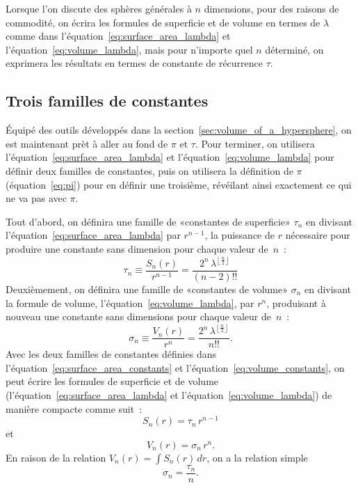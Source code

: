 Lorsque l'on discute des sphères générales à $n$ dimensions, pour des raisons de
commodité, on écrira les formules de superficie et de volume en termes de
$\lambda$ comme dans l'équation~\eqref{eq:surface_area_lambda} et
l'équation~\eqref{eq:volume_lambda}, mais pour n'importe quel $n$ déterminé, on
exprimera les résultats en termes de constante de récurrence $\tau$.




  \subsection{Trois familles de constantes} %
  \label{sec:three_families_of_constants}

Équipé des outils développés dans la section~\ref{sec:volume_of_a_hypersphere},
on est maintenant prèt à aller au fond de $\pi$ et $\tau$. Pour terminer, on
utilisera l'équation~\eqref{eq:surface_area_lambda} et
l'équation~\eqref{eq:volume_lambda} pour définir deux familles de constantes,
puis on utilisera la définition de $\pi$ (équation~\eqref{eq:pi}) pour en
définir une troisième, révéilant ainsi exactement ce qui ne va pas avec $\pi$.

Tout d'abord, on définira une famille de «\ns constantes de superficie\ns » $\tau_n$
en divisant \linebreak l'équation~\eqref{eq:surface_area_lambda} par $r^{n-1}$,
la puissance de $r$ nécessaire pour produire une constante sans dimension pour
chaque valeur de~$n$~:
\begin{equation}
\label{eq:surface_area_constants}
\tau_n \equiv \frac{S_n(r)}{r^{n-1}} = \frac{2^n\,\lambda^{\left\lfloor \frac{n}{2} \right\rfloor}}{(n-2)!!}
\end{equation}
Deuxièmement, on définira une famille de «\ns constantes de volume\ns » $\sigma_n$
en divisant la formule de volume, l'équation~\eqref{eq:volume_lambda}, par
$r^n$, produisant à nouveau une constante sans dimensions pour chaque valeur
de~$n$~:
\begin{equation}
\label{eq:volume_constants}
\sigma_n \equiv \frac{V_n(r)}{r^n} = \frac{2^n\,\lambda^{\left\lfloor \frac{n}{2} \right\rfloor}}{n!!}.
\end{equation}
Avec les deux familles de constantes définies dans
l'équation~\eqref{eq:surface_area_constants} et
l'équation~\eqref{eq:volume_constants}, on peut écrire les formules de
superficie et de volume (l'équation~\eqref{eq:surface_area_lambda} et
l'équation~\eqref{eq:volume_lambda}) de manière compacte comme suit~:
\[ S_n(r) = \tau_n\,r^{n-1} \]
et
\[ V_n(r) = \sigma_n\,r^n. \]
En raison de la relation $V_n(r) = \int S_n(r)\,dr$, on a la relation simple
\[
\sigma_n = \frac{\tau_n}{n}.
\]

